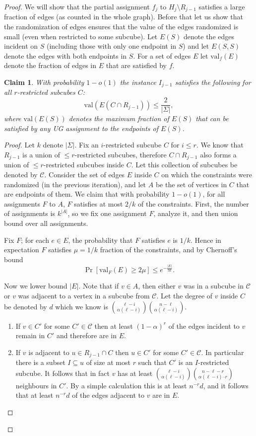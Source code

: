 \documentclass[11pt]{article}
\def \cC {\mathcal{C}}
\def \val {\mathrm{val}}
\newtheorem{claim}[theorem]{Claim}
\theoremstyle{definition}
\begin{document}
\begin{proof}
We will show that the partial assignment $f_j$ to $H_j \setminus R_{j-1}$ satisfies a large fraction of edges (as counted in the whole graph). Before that let us show that the randomization of edges ensures that the value of the edges randomized is small (even when restricted to some subcube). Let $E(S)$ denote the edges incident on $S$ (including those with only one endpoint in $S$) and let $E(S,S)$ denote the edges with both endpoints in $S$. For a set of edges $E$ let $\val_f(E)$ denote the fraction of edges in $E$ that are satisfied by $f$.


\begin{claim}\label{claim:chernoff}
With probability $1-o(1)$ the instance $I_{j-1}$ satisfies the following for all $r$-restricted subcubes $C$:
\[\val(E(C \cap R_{j-1})) \leq \frac{2}{|\Sigma|},\]
where $\val(E(S))$ denotes the maximum fraction of $E(S)$ that can be satisfied by any UG assignment to the endpoints of $E(S)$.
\end{claim}

\begin{proof}
Let $k$ denote $|\Sigma|$. Fix an $i$-restricted subcube $C$ for $i \leq r$. We know that $R_{j-1}$ is a union of $\leq r$-restricted subcubes, therefore $C\cap R_{j-1}$ also forms a union of $\leq r$-restricted subcubes inside $C$. Let this collection of subcubes be denoted by $\cC$.
Consider the set of edges $E$ inside $C$ on which the constraints were randomized (in the previous iteration), and let $A$ be the set of vertices in $C$ that are endpoints of them. We claim that with probability $1-o(1)$,  for all assignments $F$ to $A$, $F$ satisfies at most $2/k$ of the constraints. First, the number of assignments is $k^{|A|}$, so we fix one assignment $F$, analyze it, and then union bound over all assignments.


Fix $F$; for each $e\in E$, the probability that $F$ satisfies $e$ is $1/k$. Hence in expectation $F$ satisfies
$\mu = 1/k$ fraction of the constraints, and by Chernoff’s bound
\[\Pr[\val_F(E) \geq 2\mu ]\leq e^{-\frac{|E|}{3k}}.\]

Now we lower bound $|E|$. Note that if $v\in A$, then either $v$ was in a subcube in $\cC$ or $v$ was adjacent to a vertex in a subcube from $\cC$. Let the degree of $v$ inside $C$ be denoted by $d$ which we know is ${\ell-i \choose \alpha(\ell - i)}{n-\ell \choose \alpha(\ell-i)}$.

\begin{enumerate}
    \item If $v \in C'$ for some $C' \in \cC$ then at least $(1-\alpha)^{r}$ of the edges incident to $v$ remain in $C'$ and therefore are in $E$. 
    \item If $v$ is adjacent to $u \in R_{j-1}\cap C$ then $u \in C'$ for some $C' \in \cC$. In particular there is a subset $I \subseteq u$ of size at most $r$ such that $C'$ is an $I$-restricted subcube. It follows that in fact $v$ has at least ${\ell-i \choose \alpha(\ell-i)}{n-\ell-r \choose \alpha(\ell-i) – r}$ neighbours in $C'$. By a simple calculation this is at least $n^{-r} d$, and it follows that at least $n^{-r} d$ of the edges adjacent to $v$ are in $E$.
\end{enumerate}


\end{proof}
\end{proof}
\end{document}
